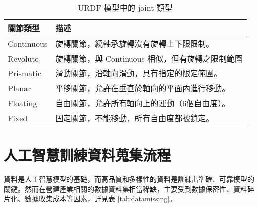 \begin{table}[H]
    \centering
    \caption{URDF 模型中的 joint 類型}
    \label{tab:urdf}
    \begin{tabular}{ll}
    \hline
    \rowcolor[HTML]{C0C0C0} 
    關節類型    & 描述                                          \\ \hline
    Continuous & 旋轉關節，繞軸承旋轉沒有旋轉上下限限制。            \\
    Revolute   & 旋轉關節，與 Continuous 相似，但有旋轉之限制範圍   \\
    Prismatic  & 滑動關節，沿軸向滑動，具有指定的限定範圍。          \\ \hline
    Planar     & 平移關節，允許在垂直於軸向的平面內進行移動。         \\
    Floating   & 自由關節，允許所有軸向上的運動（6個自由度）。        \\
    Fixed      & 固定關節，不能移動，所有自由度都被鎖定。            \\ \hline
    \end{tabular}
\end{table}

\section{人工智慧訓練資料蒐集流程}

資料是人工智慧模型的基礎，而高品質和多樣性的資料是訓練出準確、可靠模型的關鍵。然而在營建產業相關的數據資料集相當稀缺，主要受到數據保密性、資料碎片化、數據收集成本等因素，詳見表 \ref{tab:datamissing}。

